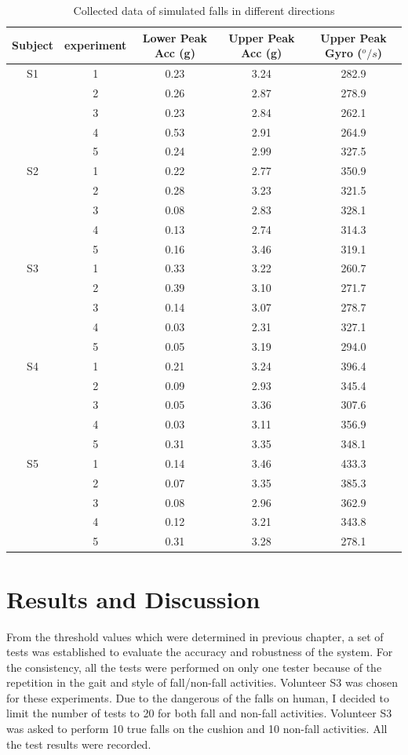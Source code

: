 \documentclass[letterpaper,12pt,titlepage,oneside,final]{book}
\let\origdoublepage\cleardoublepage
\newcommand{\clearemptydoublepage}{%
	\clearpage{\pagestyle{empty}\origdoublepage}}
\let\cleardoublepage\clearemptydoublepage
\begin{document}
\begin{table}[h]
	\begin{center}
		\begin{tabular}{ |c|c|c|c|c| } 
			\hline
			Subject & experiment & Lower Peak Acc (g) & Upper Peak Acc (g)  & Upper Peak Gyro ($^{o}/s$)\\
			\hline
			S1 & 1 & 0.23 & 3.24 & 282.9\\%
			& 2 & 0.26 & 2.87 & 278.9 \\
			& 3 & 0.23 & 2.84 & 262.1 \\
			& 4 & 0.53 &  2.91 & 264.9 \\
			& 5 & 0.24 &  2.99 & 327.5\\
			\hline
			S2 & 1 & 0.22 & 2.77 & 350.9\\
			& 2 &  0.28 &  3.23 & 321.5\\
			& 3 &  0.08 &  2.83& 328.1\\
			& 4 & 0.13 & 2.74 & 314.3\\
			& 5 & 0.16 & 3.46 & 319.1\\  %
			\hline
			S3 & 1 & 0.33 &  3.22& 260.7 \\
			& 2 &  0.39 & 3.10 & 271.7 \\
			& 3 & 0.14 & 3.07 & 278.7\\
			& 4 & 0.03 & 2.31 & 327.1\\
			& 5 & 0.05 & 3.19 & 294.0\\ %
			\hline
			S4 &1 & 0.21 & 3.24 & 396.4\\ 
			&2 &  0.09 & 2.93 & 345.4\\ 
			&3 & 0.05 & 3.36 & 307.6\\ 
			&4 & 0.03 & 3.11 & 356.9\\ 
			&5 & 0.31 & 3.35 & 348.1\\ %
			\hline
			S5 &1 & 0.14 & 3.46 & 433.3\\ 
			&2 &  0.07 & 3.35 & 385.3\\ 
			&3 & 0.08 & 2.96 & 362.9\\ 
			&4 & 0.12 & 3.21 & 343.8\\ 
			&5 & 0.31 & 3.28 & 278.1\\ %
			\hline
		\end{tabular}
		\caption{Collected data of simulated falls in different directions}
		\label{table:1}
	\end{center}
\end{table}
\cleardoublepage

\chapter{Results and Discussion}
From the threshold values which were determined in previous chapter, a set of tests was established to evaluate the accuracy and robustness of the system. For the consistency, all the tests were performed on only one tester because of the repetition in the gait and style of fall/non-fall activities. Volunteer S3 was chosen for these experiments. Due to the dangerous of the falls on human, I decided to limit the number of tests to 20 for both fall and non-fall activities. Volunteer S3 was asked to perform 10 true falls on the cushion and 10 non-fall activities. All the test results were recorded.      
\end{document}
